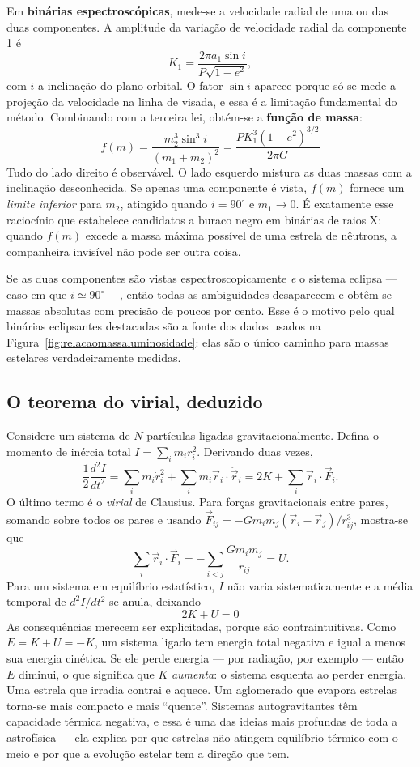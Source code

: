 \documentclass[11pt,a4paper]{article}
\begin{document}
Em \textbf{binárias espectroscópicas}, mede-se a velocidade radial de uma ou das duas componentes. A amplitude da variação de velocidade radial da componente 1 é
\[
K_1=\frac{2\pi a_1\sin i}{P\sqrt{1-e^{2}}},
\]
com $i$ a inclinação do plano orbital. O fator $\sin i$ aparece porque só se mede a projeção da velocidade na linha de visada, e essa é a limitação fundamental do método. Combinando com a terceira lei, obtém-se a \textbf{função de massa}:
\[
\boxed{\ f(m)=\frac{m_2^{3}\sin^{3}i}{(m_1+m_2)^{2}}=\frac{P K_1^{3}(1-e^{2})^{3/2}}{2\pi G}\ }
\]
Tudo do lado direito é observável. O lado esquerdo mistura as duas massas com a inclinação desconhecida. Se apenas uma componente é vista, $f(m)$ fornece um \emph{limite inferior} para $m_2$, atingido quando $i=90^\circ$ e $m_1\to0$. É exatamente esse raciocínio que estabelece candidatos a buraco negro em binárias de raios X: quando $f(m)$ excede a massa máxima possível de uma estrela de nêutrons, a companheira invisível não pode ser outra coisa.

Se as duas componentes são vistas espectroscopicamente \emph{e} o sistema eclipsa --- caso em que $i\simeq90^\circ$ ---, então todas as ambiguidades desaparecem e obtêm-se massas absolutas com precisão de poucos por cento. Esse é o motivo pelo qual binárias eclipsantes destacadas são a fonte dos dados usados na Figura~\ref{fig:relacaomassaluminosidade}: elas são o único caminho para massas estelares verdadeiramente medidas.

\subsection*{O teorema do virial, deduzido}

Considere um sistema de $N$ partículas ligadas gravitacionalmente. Defina o momento de inércia total $I=\sum_i m_ir_i^{2}$. Derivando duas vezes,
\[
\frac{1}{2}\frac{d^{2}I}{dt^{2}}=\sum_i m_i\dot{r}_i^{2}+\sum_i m_i\vec{r}_i\cdot\ddot{\vec{r}}_i
=2K+\sum_i\vec{r}_i\cdot\vec{F}_i.
\]
O último termo é o \textit{virial} de Clausius. Para forças gravitacionais entre pares, somando sobre todos os pares e usando $\vec{F}_{ij}=-Gm_im_j(\vec{r}_i-\vec{r}_j)/r_{ij}^{3}$, mostra-se que
\[
\sum_i\vec{r}_i\cdot\vec{F}_i=-\sum_{i<j}\frac{Gm_im_j}{r_{ij}}=U.
\]
Para um sistema em equilíbrio estatístico, $I$ não varia sistematicamente e a média temporal de $d^{2}I/dt^{2}$ se anula, deixando
\[
\boxed{\ 2K+U=0\ }
\]
As consequências merecem ser explicitadas, porque são contraintuitivas. Como $E=K+U=-K$, um sistema ligado tem energia total negativa e igual a menos sua energia cinética. Se ele perde energia --- por radiação, por exemplo --- então $E$ diminui, o que significa que $K$ \emph{aumenta}: o sistema esquenta ao perder energia. Uma estrela que irradia contrai e aquece. Um aglomerado que evapora estrelas torna-se mais compacto e mais ``quente''. Sistemas autogravitantes têm capacidade térmica negativa, e essa é uma das ideias mais profundas de toda a astrofísica --- ela explica por que estrelas não atingem equilíbrio térmico com o meio e por que a evolução estelar tem a direção que tem.
\end{document}
